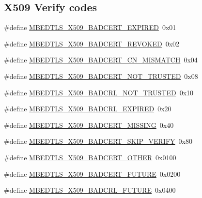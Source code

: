 \subsection*{X509 Verify codes}
\begin{DoxyCompactItemize}
\item 
\#define \mbox{\hyperlink{group__x509__module_ga5f03158dcacc5914872e38c68231b642}{M\+B\+E\+D\+T\+L\+S\+\_\+\+X509\+\_\+\+B\+A\+D\+C\+E\+R\+T\+\_\+\+E\+X\+P\+I\+R\+ED}}~0x01
\item 
\#define \mbox{\hyperlink{group__x509__module_gaddd96a9eb80fab17bce02d2a147ea504}{M\+B\+E\+D\+T\+L\+S\+\_\+\+X509\+\_\+\+B\+A\+D\+C\+E\+R\+T\+\_\+\+R\+E\+V\+O\+K\+ED}}~0x02
\item 
\#define \mbox{\hyperlink{group__x509__module_ga6e71468985ebf243ca7cfce5c3dea881}{M\+B\+E\+D\+T\+L\+S\+\_\+\+X509\+\_\+\+B\+A\+D\+C\+E\+R\+T\+\_\+\+C\+N\+\_\+\+M\+I\+S\+M\+A\+T\+CH}}~0x04
\item 
\#define \mbox{\hyperlink{group__x509__module_ga0e5b1d4c9c1a1a3227238c82042c1d1b}{M\+B\+E\+D\+T\+L\+S\+\_\+\+X509\+\_\+\+B\+A\+D\+C\+E\+R\+T\+\_\+\+N\+O\+T\+\_\+\+T\+R\+U\+S\+T\+ED}}~0x08
\item 
\#define \mbox{\hyperlink{group__x509__module_gad1da8228ca957c2947fd329c32fc7ca4}{M\+B\+E\+D\+T\+L\+S\+\_\+\+X509\+\_\+\+B\+A\+D\+C\+R\+L\+\_\+\+N\+O\+T\+\_\+\+T\+R\+U\+S\+T\+ED}}~0x10
\item 
\#define \mbox{\hyperlink{group__x509__module_gaebccb1707af21f2d3d6610a7c6485f32}{M\+B\+E\+D\+T\+L\+S\+\_\+\+X509\+\_\+\+B\+A\+D\+C\+R\+L\+\_\+\+E\+X\+P\+I\+R\+ED}}~0x20
\item 
\#define \mbox{\hyperlink{group__x509__module_ga8bca03e3c2c89460bea17ab142b0b7ab}{M\+B\+E\+D\+T\+L\+S\+\_\+\+X509\+\_\+\+B\+A\+D\+C\+E\+R\+T\+\_\+\+M\+I\+S\+S\+I\+NG}}~0x40
\item 
\#define \mbox{\hyperlink{group__x509__module_ga1b87b2e1d26077023adf2a5c65a76776}{M\+B\+E\+D\+T\+L\+S\+\_\+\+X509\+\_\+\+B\+A\+D\+C\+E\+R\+T\+\_\+\+S\+K\+I\+P\+\_\+\+V\+E\+R\+I\+FY}}~0x80
\item 
\#define \mbox{\hyperlink{group__x509__module_ga76bdd50937a671ef62474b7e38e23e02}{M\+B\+E\+D\+T\+L\+S\+\_\+\+X509\+\_\+\+B\+A\+D\+C\+E\+R\+T\+\_\+\+O\+T\+H\+ER}}~0x0100
\item 
\#define \mbox{\hyperlink{group__x509__module_gac769acbb18e53198ae2d2e63bd339cfa}{M\+B\+E\+D\+T\+L\+S\+\_\+\+X509\+\_\+\+B\+A\+D\+C\+E\+R\+T\+\_\+\+F\+U\+T\+U\+RE}}~0x0200
\item 
\#define \mbox{\hyperlink{group__x509__module_gad93c0f614969729f7d13fb0a3acac68e}{M\+B\+E\+D\+T\+L\+S\+\_\+\+X509\+\_\+\+B\+A\+D\+C\+R\+L\+\_\+\+F\+U\+T\+U\+RE}}~0x0400

\end{DoxyCompactItemize}
